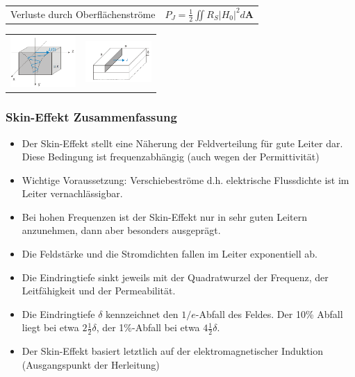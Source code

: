 \documentclass[english]{latex4ei/latex4ei_sheet}
\begin{document}
\begin{sectionbox}
\begin{tabular*}{\columnwidth}{ll}
	Verluste durch Oberflächenströme & $P_J = \frac{1}{2} \iint R_S |H_0|^2 d\mathbf{A}$ \\
\end{tabular*}
\begin{tabular*}{\columnwidth}{ll}
\includegraphics[width = 2.5cm]{./img/skin_effekt.png} & \includegraphics[width = 2.5cm]{./img/skin_effekt_verlust.png}\\
\end{tabular*}
\end{sectionbox}
\begin{sectionbox}
\subsubsection{Skin-Effekt Zusammenfassung}
\begin{itemize}
	\item Der Skin-Effekt stellt eine Näherung der Feldverteilung für gute Leiter dar. Diese Bedingung ist frequenzabhängig (auch wegen der Permittivität)
	\item Wichtige Voraussetzung: Verschiebeströme d.h. elektrische Flussdichte ist im Leiter vernachlässigbar.
	\item Bei hohen Frequenzen ist der Skin-Effekt nur in sehr guten Leitern anzunehmen, dann aber besonders ausgeprägt.
	\item Die Feldstärke und die Stromdichten fallen im Leiter exponentiell ab.
	\item Die Eindringtiefe sinkt jeweils mit der Quadratwurzel der Frequenz, der Leitfähigkeit und der Permeabilität.
	\item Die Eindringtiefe $\delta$ kennzeichnet den $1/e$-Abfall des Feldes. Der 10\% Abfall liegt bei etwa $2 \frac{1}{2} \delta$, der 1\%-Abfall bei etwa $4 \frac{1}{2} \delta$.
	\item Der Skin-Effekt basiert letztlich auf der elektromagnetischer Induktion (Ausgangspunkt der Herleitung)
\end{itemize}
\end{sectionbox}
\end{document}
